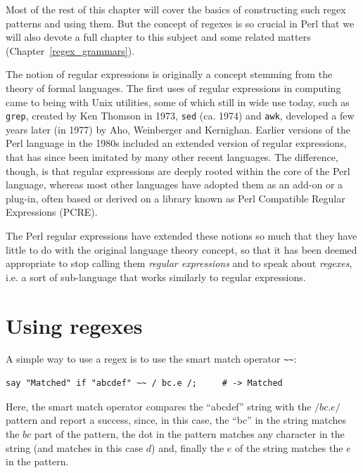 Most of the rest of this chapter will cover the basics of constructing 
such regex patterns and using them. But the concept of 
regexes is so crucial in Perl that we will also devote a full 
chapter to this subject and some related matters (Chapter~\ref{regex_grammars}).

The notion of regular expressions is originally a concept 
stemming from the theory of formal languages. The first 
uses of regular expressions in computing came to being 
with Unix utilities, some of which still in wide use today, such as 
{\tt grep}, created by Ken Thomson in 1973, {\tt sed} (ca. 1974) and 
{\tt awk}, developed a few years later (in 1977) by Aho, Weinberger and Kernighan. 
Earlier versions of the Perl language in the 1980s included an 
extended version of regular expressions, that has since 
been imitated by many other recent languages. The difference, 
though, is that regular expressions are deeply rooted within the 
core of the Perl language, whereas most other languages have 
adopted them as an add-on or a plug-in, often based or derived 
on a library known as Perl Compatible Regular Expressions (PCRE).

The Perl regular expressions have extended these notions 
so much that they have little to do with the original 
language theory concept, so that 
it has been deemed appropriate to stop calling them 
\emph{regular expressions} and to speak about \emph{regexes}, 
i.e. a sort of sub-language that works similarly to regular 
expressions.

\section{Using regexes}
\label{using_regexes}

A simple way to use a regex is to use the smart match operator 
\verb'~~':

\begin{verbatim}
say "Matched" if "abcdef" ~~ / bc.e /;     # -> Matched
\end{verbatim}
%

Here, the smart match operator compares the ``abcdef'' string 
with the $/bc.e/$ pattern and report a success, since, in 
this case, the ``bc'' in the string matches the $bc$ part of 
the pattern, the dot in the pattern matches any character in the string (and matches in this case $d$) and, finally the $e$ of 
the string matches the $e$ in the pattern.

